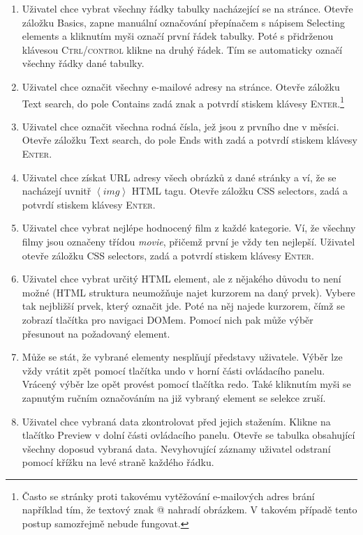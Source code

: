 \documentclass[thesis=B,czech]{FITthesis}[2012/06/26]
\begin{document}
\begin{enumerate}
	\item Uživatel chce vybrat všechny řádky tabulky nacházející se na stránce. Otevře záložku \textsf{Basics}, zapne manuální označování přepínačem s nápisem \textsf{Selecting elements} a kliknutím myši označí první řádek tabulky. Poté s přidrženou klávesou \textsc{Ctrl/control} klikne na druhý řádek. Tím se automaticky označí všechny řádky dané tabulky.
	\item Uživatel chce označit všechny e-mailové adresy na stránce. Otevře záložku \textsf{Text search}, do pole \textsf{Contains} zadá znak  a potvrdí stiskem klávesy \textsc{Enter}.\footnote{Často se stránky proti takovému vytěžování e-mailových adres brání například tím, že textový znak @ nahradí obrázkem. V takovém případě tento postup samozřejmě nebude fungovat.}
	\item Uživatel chce označit všechna rodná čísla, jež jsou z prvního dne v měsíci. Otevře záložku \textsf{Text search}, do pole \textsf{Ends with} zadá  a potvrdí stiskem klávesy \textsc{Enter}.
	\item Uživatel chce získat URL adresy všech obrázků z dané stránky a ví, že se nacházejí uvnitř $\left<img\right>$ HTML tagu. Otevře záložku \textsf{CSS selectors}, zadá  a potvrdí stiskem klávesy \textsc{Enter}.
	\item Uživatel chce vybrat nejlépe hodnocený film z každé kategorie. Ví, že všechny filmy jsou označeny třídou \textit{movie}, přičemž první je vždy ten nejlepší. Uživatel otevře záložku \textsf{CSS selectors}, zadá  a potvrdí stiskem klávesy \textsc{Enter}.
	\item Uživatel chce vybrat určitý HTML element, ale z nějakého důvodu to není možné (HTML struktura neumožňuje najet kurzorem na daný prvek). Vybere tak nejbližší prvek, který označit jde. Poté na něj najede kurzorem, čímž se zobrazí tlačítka pro navigaci DOMem. Pomocí nich pak může výběr přesunout na požadovaný element.
	\item Může se stát, že vybrané elementy nesplňují představy uživatele. Výběr lze vždy vrátit zpět pomocí tlačítka \textsf{undo} v horní části ovládacího panelu. Vrácený výběr lze opět provést pomocí tlačítka \textsf{redo}. Také kliknutím myši se zapnutým ručním označováním na již vybraný element se selekce zruší.
	\item Uživatel chce vybraná data zkontrolovat před jejich stažením. Klikne na tlačítko \textsf{Preview} v dolní části ovládacího panelu. Otevře se tabulka obsahující všechny doposud vybraná data. Nevyhovující záznamy uživatel odstraní pomocí křížku na levé straně každého řádku.
\end{enumerate}
\end{document}

